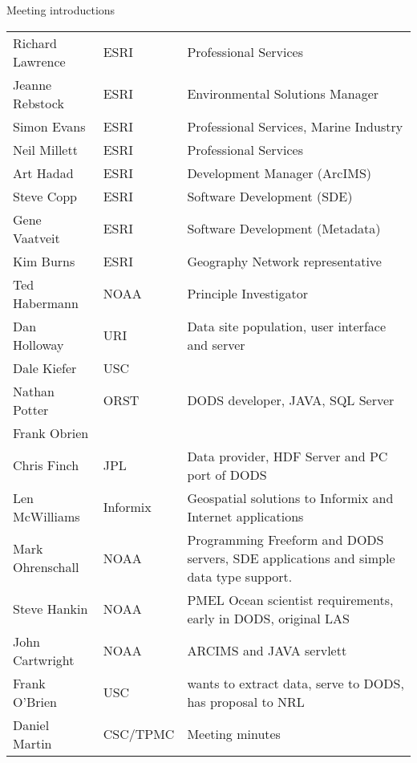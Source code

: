 Meeting introductions
\begin{center}
\begin{tabular}{llp{2.5in}} \\ 
Richard Lawrence &      ESRI &          Professional Services \\
Jeanne Rebstock &       ESRI &          Environmental Solutions Manager \\
Simon Evans &           ESRI &          Professional Services, Marine Industry \\
Neil Millett &          ESRI &          Professional Services \\
Art Hadad &             ESRI &          Development Manager (ArcIMS) \\
Steve Copp &            ESRI &          Software Development (SDE) \\
Gene Vaatveit &         ESRI &          Software Development (Metadata) \\
Kim Burns &             ESRI &          Geography Network representative \\
Ted Habermann &         NOAA &          Principle Investigator  \\
Dan Holloway &          URI &           Data site population, user interface and server \\
Dale Kiefer &           USC & \\
Nathan Potter &         ORST &          DODS developer, JAVA, SQL Server \\
Frank Obrien & & \\
Chris Finch &           JPL &           Data provider, HDF Server and PC port of DODS \\
Len McWilliams &        Informix &      Geospatial solutions to Informix and Internet applications \\
Mark Ohrenschall &      NOAA &          Programming Freeform and DODS servers, SDE  applications and simple data type support. \\
Steve Hankin &          NOAA &        PMEL Ocean scientist requirements, early in DODS, original LAS  \\
John Cartwright &       NOAA &          ARCIMS and JAVA servlett \\
Frank O'Brien &         USC &           wants to extract data, serve to DODS, has proposal to NRL \\
Daniel Martin &         CSC/TPMC &      Meeting minutes \\
\end{tabular}
\end{center}


